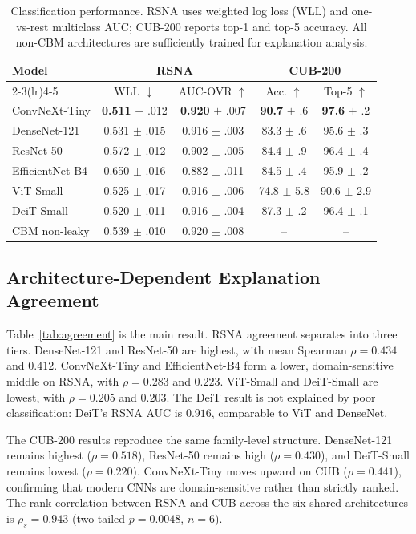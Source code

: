 \documentclass{bmvc2k}
\begin{document}
\begin{table}[t]
\centering
\small
\begin{tabular}{lcccc}
\toprule
\multirow{2}{*}{Model} & \multicolumn{2}{c}{RSNA} & \multicolumn{2}{c}{CUB-200}\\
\cmidrule(lr){2-3}\cmidrule(lr){4-5}
 & WLL $\downarrow$ & AUC-OVR $\uparrow$ & Acc. $\uparrow$ & Top-5 $\uparrow$\\
\midrule
ConvNeXt-Tiny & \textbf{0.511} $\pm$ .012 & \textbf{0.920} $\pm$ .007 & \textbf{90.7} $\pm$ .6 & \textbf{97.6} $\pm$ .2\\
DenseNet-121 & 0.531 $\pm$ .015 & 0.916 $\pm$ .003 & 83.3 $\pm$ .6 & 95.6 $\pm$ .3\\
ResNet-50 & 0.572 $\pm$ .012 & 0.902 $\pm$ .005 & 84.4 $\pm$ .9 & 96.4 $\pm$ .4\\
EfficientNet-B4 & 0.650 $\pm$ .016 & 0.882 $\pm$ .011 & 84.5 $\pm$ .4 & 95.9 $\pm$ .2\\
ViT-Small & 0.525 $\pm$ .017 & 0.916 $\pm$ .006 & 74.8 $\pm$ 5.8 & 90.6 $\pm$ 2.9\\
DeiT-Small & 0.520 $\pm$ .011 & 0.916 $\pm$ .004 & 87.3 $\pm$ .2 & 96.4 $\pm$ .1\\
CBM non-leaky & 0.539 $\pm$ .010 & 0.920 $\pm$ .008 & -- & --\\
\bottomrule
\end{tabular}
\caption{Classification performance. RSNA uses weighted log loss (WLL) and one-vs-rest multiclass AUC; CUB-200 reports top-1 and top-5 accuracy. All non-CBM architectures are sufficiently trained for explanation analysis.}
\label{tab:classification}
\end{table}

\subsection{Architecture-Dependent Explanation Agreement}

Table~\ref{tab:agreement} is the main result. RSNA agreement separates into three tiers. DenseNet-121 and ResNet-50 are highest, with mean Spearman $\rho=0.434$ and $0.412$. ConvNeXt-Tiny and EfficientNet-B4 form a lower, domain-sensitive middle on RSNA, with $\rho=0.283$ and $0.223$. ViT-Small and DeiT-Small are lowest, with $\rho=0.205$ and $0.203$. The DeiT result is not explained by poor classification: DeiT's RSNA AUC is $0.916$, comparable to ViT and DenseNet.

The CUB-200 results reproduce the same family-level structure. DenseNet-121 remains highest ($\rho=0.518$), ResNet-50 remains high ($\rho=0.430$), and DeiT-Small remains lowest ($\rho=0.220$). ConvNeXt-Tiny moves upward on CUB ($\rho=0.441$), confirming that modern CNNs are domain-sensitive rather than strictly ranked. The rank correlation between RSNA and CUB across the six shared architectures is $\rho_s=0.943$ (two-tailed $p=0.0048$, $n=6$).
\end{document}
